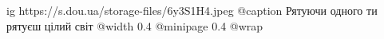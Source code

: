  
 
 
 
 

\ifcmt
  ig https://s.dou.ua/storage-files/6y3S1H4.jpeg
  @caption Рятуючи одного ти рятуєш цілий світ
  @width 0.4
  @minipage 0.4
  @wrap \parpic[r]
\fi
